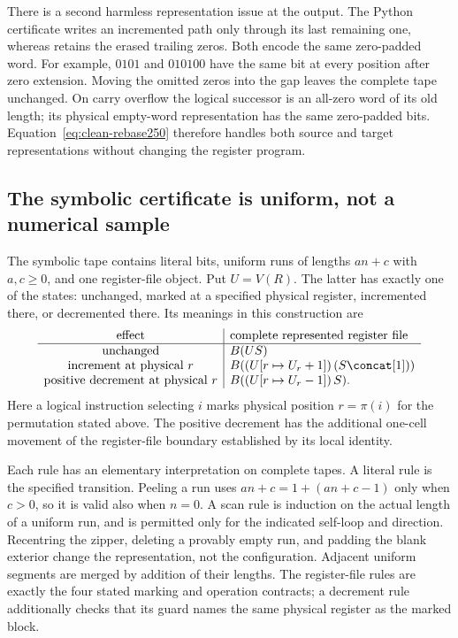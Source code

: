 There is a second harmless representation issue at the output.  The
Python certificate writes an incremented path only through its last
remaining one, whereas  retains the
erased trailing zeros.  Both encode the same zero-padded word.  For
example, $0101$ and $010100$ have the same bit at every position after
zero extension.  Moving the omitted zeros into the gap leaves the
complete tape unchanged.  On carry overflow the logical successor is
an all-zero word of its old length; its physical empty-word
representation has the same zero-padded bits.  Equation~\eqref{eq:clean-rebase250}
therefore handles both source and target representations without
changing the register program.

\subsection{The symbolic certificate is uniform, not a numerical sample}

The symbolic tape contains literal bits, uniform runs of lengths
$an+c$ with $a,c\ge0$, and one register-file object.  Put $U=V(R)$.
The latter has
exactly one of the states: unchanged, marked at a specified physical
register, incremented there, or decremented there.  Its meanings in
this construction are
\[
\begin{array}{c|l}
\text{effect}&\text{complete represented register file}\\\hline
\text{unchanged}&B(US)\\
\text{increment at physical }r&B((U[r\mapsto U_r+1])\,(S\concat[1]))\\
\text{positive decrement at physical }r&B((U[r\mapsto U_r-1])\,S).
\end{array}
\]
Here a logical instruction selecting $i$ marks physical position
$r=\pi(i)$ for the permutation stated above.  The positive decrement
has the additional one-cell movement of the
register-file boundary established by its local identity.

Each rule has an elementary interpretation on complete tapes.
A literal rule is the specified transition.  Peeling a run uses
$an+c=1+(an+c-1)$ only when $c>0$, so it is valid also when $n=0$.
A scan rule is induction on the actual length of a uniform run, and
is permitted only for the indicated self-loop and direction.
Recentring the zipper, deleting a provably empty run, and padding
the blank exterior change the representation, not the configuration.
Adjacent uniform segments are merged by addition of their lengths.
The register-file rules are exactly the four stated marking and
operation contracts; a decrement rule additionally checks that its
guard names the same physical register as the marked block.

